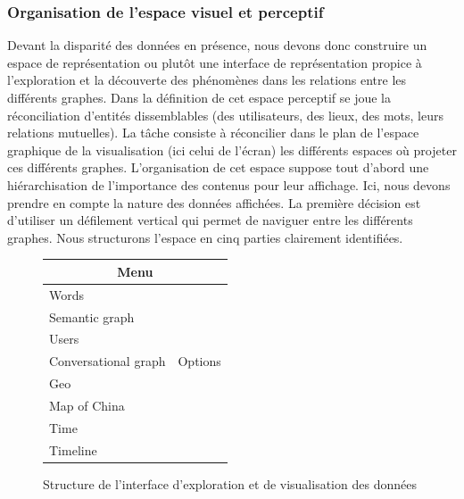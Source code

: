 \subsubsection{Organisation de l'espace visuel et perceptif}
\label{sec:viz}
    Devant la disparité des données en présence, nous devons donc construire un espace de représentation ou plut\^ot une interface de représentation propice à l{\textquoteright}exploration et la découverte des phénomènes dans les relations entre les différents graphes. Dans la définition de cet espace perceptif se joue la réconciliation d{\textquoteright}entités dissemblables (des utilisateurs, des lieux, des mots, leurs relations mutuelles). La t\^ache consiste à réconcilier dans le plan de l{\textquoteright}espace graphique de la visualisation (ici celui de l{\textquoteright}écran) les différents espaces o\`u projeter ces différents graphes. L'organisation de cet espace suppose tout d'abord une hiérarchisation de l'importance des contenus pour leur affichage. Ici, nous devons prendre en compte la nature des données affichées. La première décision est d'utiliser un défilement vertical qui permet de naviguer entre les différents graphes. Nous structurons l'espace en cinq parties clairement identifiées.


    \begin{figure}[h!]
        \label{fig:schema-viz}
        \centering

        \begin{tabular}{ | p{5cm} | p{2cm} | }
            \hline
            \multicolumn{2}{|c|}{Menu} \\[.3cm] 
            \hline
            Words  &         \\
            Semantic graph &  \\[.5cm] \cline{1-1}
            Users &  \\
            Conversational graph & Options\\[.5cm] \cline{1-1}
            Geo &  \\
            Map of China &  \\[.5cm] \cline{1-1}
            Time   & \\
            Timeline &  \\[.5cm]
            \hline 
        \end{tabular}
        \caption{Structure de l'interface d'exploration et de visualisation des données}
    \end{figure}


